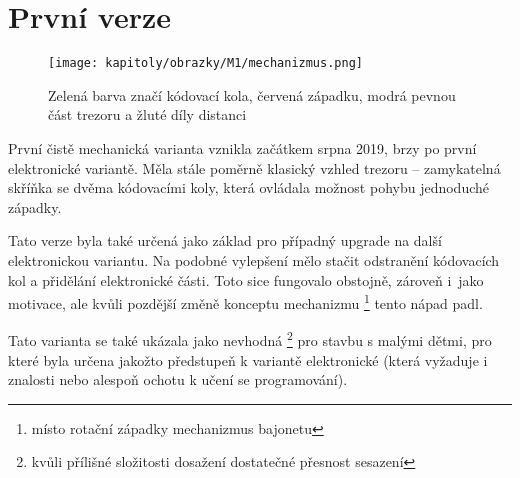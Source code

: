 \section{První verze}
\label{M1-vyvoj}

\begin{wrapfigure}{R}{0.4\textwidth}
    \centering
    \texttt{[image: kapitoly/obrazky/M1/mechanizmus.png]}
    \caption{Zelená barva značí kódovací kola, červená západku, modrá pevnou část trezoru a žluté díly distanci \centering}
    \label{fig:M1-mechanizmus}
\end{wrapfigure}
První čistě mechanická varianta vznikla začátkem srpna 2019, brzy po první  elektronické variantě.
Měla stále poměrně klasický vzhled trezoru -- zamykatelná skříňka se dvěma  kódovacími koly, která ovládala možnost pohybu jednoduché západky.

Tato verze byla také určená jako základ pro případný upgrade na další elektronickou
variantu. Na podobné vylepšení mělo stačit odstranění kódo\-va\-cích kol a přidělání elektronické části. Toto sice fungovalo obstojně, zároveň 
i~jako motivace, ale kvůli pozdější změně konceptu mechanizmu \footnote{místo rotační západky mechanizmus bajonetu} tento nápad padl.

Tato varianta se také ukázala jako nevhodná \footnote{kvůli přílišné složitosti dosažení dostatečné přesnost sesazení} pro stavbu s malými dětmi, 
pro které byla určena jakožto předstupeň k variantě elektronické (která vyžaduje i znalosti nebo alespoň ochotu k učení se programování).

\newpage